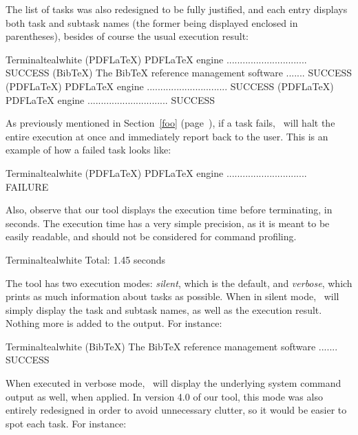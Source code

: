 The list of tasks was also redesigned to be fully justified, and each entry displays both task and subtask names (the former being displayed enclosed in parentheses), besides of course the usual execution result:

\begin{codebox}{Terminal}{teal}{\icnote}{white}
(PDFLaTeX) PDFLaTeX engine .............................. SUCCESS
(BibTeX) The BibTeX reference management software ....... SUCCESS
(PDFLaTeX) PDFLaTeX engine .............................. SUCCESS
(PDFLaTeX) PDFLaTeX engine .............................. SUCCESS
\end{codebox}

As previously mentioned in Section~\ref{foo} (page~\pageref{foo}), if a task fails, \arara\ will halt the entire execution at once and immediately report back to the user. This is an example of how a failed task looks like:

\begin{codebox}{Terminal}{teal}{\icnote}{white}
(PDFLaTeX) PDFLaTeX engine .............................. FAILURE
\end{codebox}

Also, observe that our tool displays the execution time before terminating, in seconds. The execution time has a very simple precision, as it is meant to be easily readable, and should not be considered for command profiling.

\begin{codebox}{Terminal}{teal}{\icnote}{white}
Total: 1.45 seconds
\end{codebox}

The tool has two execution modes: \emph{silent}, which is the default, and \emph{verbose}, which prints as much information about tasks as possible. When in silent mode, \arara\ will simply display the task and subtask names, as well as the execution result. Nothing more is added to the output. For instance:

\begin{codebox}{Terminal}{teal}{\icnote}{white}
(BibTeX) The BibTeX reference management software ....... SUCCESS
\end{codebox}

When executed in verbose mode, \arara\ will display the underlying system command output as well, when applied. In version 4.0 of our tool, this mode was also entirely redesigned in order to avoid unnecessary clutter, so it would be easier to spot each task. For instance:

